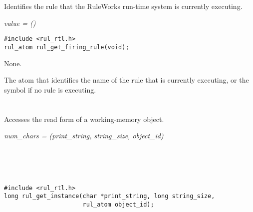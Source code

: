 \section*{}

Identifies the rule that the RuleWorks run-time system is currently
executing.

\Syntax

\it{value} = ()

\begin{args}
\end{args}

\CBinding
\begin{verbatim}
#include <rul_rtl.h>
rul_atom rul_get_firing_rule(void);
\end{verbatim}

\Arguments

None.

\ReturnValue

The  atom that identifies the name of the rule that is
currently executing, or the symbol  if no rule is executing.

\section*{}

Accesses the read form of a working-memory object.

\Syntax

\it{num\_chars} = (\it{print\_string},
\it{string\_size}, \it{object\_id})

\begin{args}
   \\
   \\
   \\
\end{args}

\CBinding
\begin{verbatim}
#include <rul_rtl.h>
long rul_get_instance(char *print_string, long string_size,
                      rul_atom object_id);
\end{verbatim}


